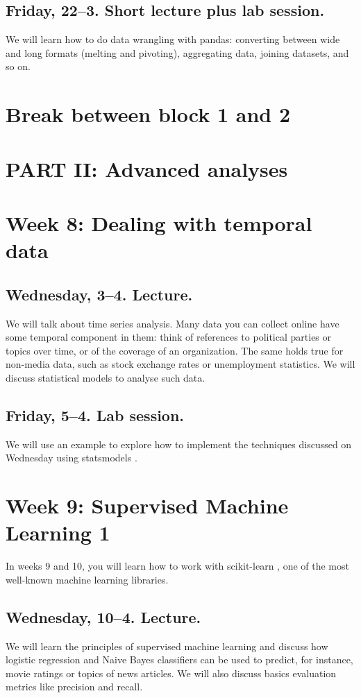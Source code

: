 \documentclass[a4paper,10pt]{report}
\begin{document}
\subsection*{Friday, 22--3.  Short lecture plus lab session.}
We will learn how to do data wrangling with pandas: converting between wide and long formats (melting and pivoting), aggregating data, joining datasets, and so on.


\section*{Break between block 1 and 2}

\section*{PART II: Advanced analyses}


\section*{Week 8: Dealing with temporal data}

\subsection*{Wednesday, 3--4. Lecture.}
We will talk about time series analysis. Many data you can collect online have some temporal component in them: think of references to political parties or topics over time, or of the coverage of an organization. The same holds true for non-media data, such as stock exchange rates or unemployment statistics. We will discuss statistical models to analyse such data.

\subsection*{Friday, 5--4. Lab session.}
We will use an example to explore how to implement the techniques discussed on Wednesday using statsmodels \citep{statsmodels}.



\section*{Week 9: Supervised Machine Learning 1}
In weeks 9 and 10, you will learn how to work with scikit-learn \citep{scikit-learn}, one of the most well-known machine learning libraries.


\subsection*{Wednesday, 10--4. Lecture.}
We will learn the principles of supervised machine learning and discuss how logistic regression and Naive Bayes classifiers can be used to predict, for instance, movie ratings or topics of news articles. We will also discuss basics evaluation metrics like precision and recall.
\end{document}
